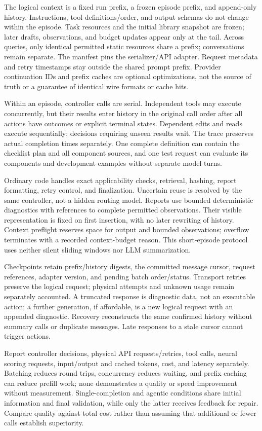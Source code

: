The logical context is a fixed run prefix, a frozen episode prefix, and append-only history. Instructions, tool definitions/order, and output schemas do not change within the episode. Task resources and the initial library snapshot are frozen; later drafts, observations, and budget updates appear only at the tail. Across queries, only identical permitted static resources share a prefix; conversations remain separate. The manifest pins the serializer/API adapter. Request metadata and retry timestamps stay outside the shared prompt prefix. Provider continuation IDs and prefix caches are optional optimizations, not the source of truth or a guarantee of identical wire formats or cache hits.

Within an episode, controller calls are serial. Independent tools may execute concurrently, but their results enter history in the original call order after all actions have outcomes or explicit terminal states. Dependent edits and reads execute sequentially; decisions requiring unseen results wait. The trace preserves actual completion times separately. One complete definition can contain the checklist plan and all component sources, and one test request can evaluate its components and development examples without separate model turns.

Ordinary code handles exact applicability checks, retrieval, hashing, report formatting, retry control, and finalization. Uncertain reuse is resolved by the same controller, not a hidden routing model. Reports use bounded deterministic diagnostics with references to complete permitted observations. Their visible representation is fixed on first insertion, with no later rewriting of history. Context preflight reserves space for output and bounded observations; overflow terminates with a recorded context-budget reason. This short-episode protocol uses neither silent sliding windows nor LLM summarization.

Checkpoints retain prefix/history digests, the committed message cursor, request references, adapter version, and pending batch order/status. Transport retries preserve the logical request; physical attempts and unknown usage remain separately accounted. A truncated response is diagnostic data, not an executable action; a further generation, if affordable, is a new logical request with an appended diagnostic. Recovery reconstructs the same confirmed history without summary calls or duplicate messages. Late responses to a stale cursor cannot trigger actions.

Report controller decisions, physical API requests/retries, tool calls, neural scoring requests, input/output and cached tokens, cost, and latency separately. Batching reduces round trips, concurrency reduces waiting, and prefix caching can reduce prefill work; none demonstrates a quality or speed improvement without measurement. Single-completion and agentic conditions share initial information and final validation, while only the latter receives feedback for repair. Compare quality against total cost rather than assuming that additional or fewer calls establish superiority.

